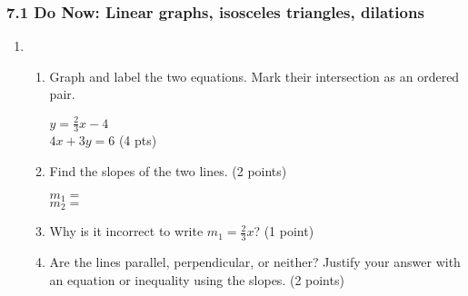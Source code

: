 \documentclass[12pt, twoside]{article}
\begin{document}
\subsubsection*{7.1 Do Now: Linear graphs, isosceles triangles, dilations}
  \begin{enumerate}
  \item \begin{enumerate}
    \item Graph and label the two equations. Mark their intersection as an ordered pair.
      \begin{multicols}{2}
        $y =\frac{2}{3}x-4$ \\
        $4x+3y=6$ \hfill (4 pts)
      \end{multicols}     \vspace{1cm}
    \item Find the slopes of the two lines. \hfill (2 points)
      \begin{multicols}{2}
        $m_1=$ \\
        $m_2=$
      \end{multicols}
    \item Why is it incorrect to write $m_1=\frac{2}{3}x$? \hfill (1 point) \vspace{2cm}
    \item Are the lines parallel, perpendicular, or neither? Justify your answer with an equation or inequality using the slopes. \hfill (2 points)
    \vspace{2cm}
  \end{enumerate}
    \begin{center}
    \end{center}


\end{enumerate}
\end{document}
